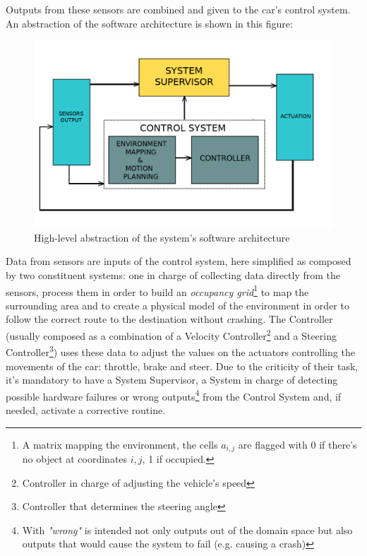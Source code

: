 Outputs from these sensors are combined and given to the car's control system.
An abstraction of the software architecture is shown in this figure:
\vspace{-1cm}
\begin{figure}[h!]
	\includegraphics[width=\textwidth]{img/av-architecture.png}
	\caption{High-level abstraction of the system's software architecture}
\end{figure}

Data from sensors are inputs of the control system, here simplified as composed by two constituent systems: one in charge of collecting data directly from the sensors, process them in order to build an \textsl{occupancy grid}\footnote{A matrix mapping the environment, the cells $a_{i,j}$ are flagged with 0 if there's no object at coordinates $i,j$, 1 if occupied.} to map the surrounding area and to create a physical model of the environment in order to follow the correct route to the destination without crashing. The Controller (usually composed as a combination of a Velocity Controller\footnote{Controller in charge of adjusting the vehicle's speed} and a Steering Controller\footnote{Controller that determines the steering angle}) uses these data to adjust the values on the actuators controlling the movements of the car: throttle, brake and steer.\newline
Due to the criticity of their task, it's mandatory to have a System Supervisor, a System in charge of detecting possible hardware failures or wrong outputs\footnote{With \textsl{"wrong"} is intended not only outputs out of the domain space but also outputs that would cause the system to fail (e.g. causing a crash)} from the Control System and, if needed, activate a corrective routine.

